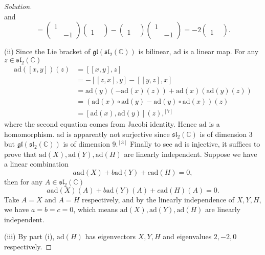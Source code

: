 \documentclass{article}
\theoremstyle{definition}
\theoremstyle{plain}
\begin{document}
\begin{adjustwidth}{0.7cm}{}
\begin{proof}[Solution]
\begin{displaymath}
\end{displaymath}
and
\begin{displaymath}
[H,Y]=\begin{pmatrix}1&\\ &-1\end{pmatrix}\begin{pmatrix}&\\ 1&\end{pmatrix}-\begin{pmatrix}&\\ 1&\end{pmatrix}\begin{pmatrix}1&\\ &-1\end{pmatrix}=-2\begin{pmatrix}&\\ 1&\end{pmatrix}.
\end{displaymath}\par
(ii) Since the Lie bracket of $\mathfrak{gl}(\mathfrak{sl}_2(\mathbb{C}))$ is bilinear, $\mathrm{ad}$ is a linear map. For any $z\in\mathfrak{sl}_2(\mathbb{C})$
\begin{align*}
\mathrm{ad}([x,y])(z)&=[[x,y],z]\\
&=-[[z,x],y]-[[y,z],x]\\
&=\mathrm{ad}(y)(-\mathrm{ad}(x)(z))+\mathrm{ad}(x)(\mathrm{ad}(y)(z))\\
&=(\mathrm{ad}(x)\circ\mathrm{ad}(y)-\mathrm{ad}(y)\circ\mathrm{ad}(x))(z)\\
&=[\mathrm{ad}(x),\mathrm{ad}(y)](z),^{[7]}
\end{align*}
where the second equation comes from Jacobi identity. Hence $\mathrm{ad}$ is a homomorphism. $\mathrm{ad}$ is apparently not surjective since $\mathfrak{sl}_2(\mathbb{C})$ is of dimension 3 but $\mathfrak{gl}(\mathfrak{sl}_2(\mathbb{C}))$ is of dimension 9$.^{[3]}$ Finally to see $\mathrm{ad}$ is injective, it suffices to prove that $\mathrm{ad}(X),\mathrm{ad}(Y),\mathrm{ad}(H)$ are linearly independent. Suppose we have a linear combination
\begin{displaymath}
a\mathrm{ad}(X)+b\mathrm{ad}(Y)+c\mathrm{ad}(H)=0,
\end{displaymath}
then for any $A\in\mathfrak{sl}_2(\mathbb{C})$
\begin{displaymath}
a\mathrm{ad}(X)(A)+b\mathrm{ad}(Y)(A)+c\mathrm{ad}(H)(A)=0.
\end{displaymath}
Take $A=X$ and $A=H$ respectively, and by the linearly independence of $X,Y,H$, we have $a=b=c=0$, which means $\mathrm{ad}(X),\mathrm{ad}(Y),\mathrm{ad}(H)$ are linearly independent.\par
(iii) By part (i), $\mathrm{ad}(H)$ has eigenvectors $X,Y,H$ and eigenvalues $2,-2,0$ respectively.
\color{black}
\end{proof}
\end{adjustwidth}
\end{document}
